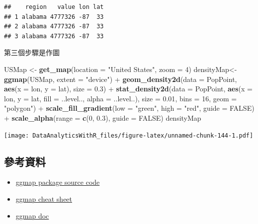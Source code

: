 \documentclass[]{book}
\newenvironment{Shaded}{\begin{snugshade}}{\end{snugshade}}
\newcommand{\KeywordTok}[1]{\textcolor[rgb]{0.13,0.29,0.53}{\textbf{{#1}}}}
\newcommand{\DataTypeTok}[1]{\textcolor[rgb]{0.13,0.29,0.53}{{#1}}}
\newcommand{\DecValTok}[1]{\textcolor[rgb]{0.00,0.00,0.81}{{#1}}}
\newcommand{\FloatTok}[1]{\textcolor[rgb]{0.00,0.00,0.81}{{#1}}}
\newcommand{\StringTok}[1]{\textcolor[rgb]{0.31,0.60,0.02}{{#1}}}
\newcommand{\OtherTok}[1]{\textcolor[rgb]{0.56,0.35,0.01}{{#1}}}
\newcommand{\NormalTok}[1]{{#1}}
\providecommand{\tightlist}{%
  \setlength{\itemsep}{0pt}\setlength{\parskip}{0pt}}
\theoremstyle{definition}
\theoremstyle{definition}
\theoremstyle{remark}
\begin{document}
\begin{verbatim}
##    region   value lon lat
## 1 alabama 4777326 -87  33
## 2 alabama 4777326 -87  33
## 3 alabama 4777326 -87  33
\end{verbatim}

第三個步驟是作圖

\begin{Shaded}
\begin{Highlighting}[]
\NormalTok{USMap <-}\StringTok{ }\KeywordTok{get_map}\NormalTok{(}\DataTypeTok{location =} \StringTok{"United States"}\NormalTok{, }\DataTypeTok{zoom =} \DecValTok{4}\NormalTok{)}
\NormalTok{densityMap<-}\KeywordTok{ggmap}\NormalTok{(USMap, }\DataTypeTok{extent =} \StringTok{"device"}\NormalTok{) +}\StringTok{ }
\StringTok{    }\KeywordTok{geom_density2d}\NormalTok{(}\DataTypeTok{data =} \NormalTok{PopPoint, }\KeywordTok{aes}\NormalTok{(}\DataTypeTok{x =} \NormalTok{lon, }\DataTypeTok{y =} \NormalTok{lat), }\DataTypeTok{size =} \FloatTok{0.3}\NormalTok{) +}\StringTok{ }
\StringTok{    }\KeywordTok{stat_density2d}\NormalTok{(}\DataTypeTok{data =} \NormalTok{PopPoint, }
            \KeywordTok{aes}\NormalTok{(}\DataTypeTok{x =} \NormalTok{lon, }\DataTypeTok{y =} \NormalTok{lat, }\DataTypeTok{fill =} \NormalTok{..level.., }\DataTypeTok{alpha =} \NormalTok{..level..), }
                \DataTypeTok{size =} \FloatTok{0.01}\NormalTok{, }\DataTypeTok{bins =} \DecValTok{16}\NormalTok{, }\DataTypeTok{geom =} \StringTok{"polygon"}\NormalTok{) +}\StringTok{ }
\StringTok{    }\KeywordTok{scale_fill_gradient}\NormalTok{(}\DataTypeTok{low =} \StringTok{"green"}\NormalTok{, }\DataTypeTok{high =} \StringTok{"red"}\NormalTok{, }\DataTypeTok{guide =} \OtherTok{FALSE}\NormalTok{) +}\StringTok{ }
\StringTok{    }\KeywordTok{scale_alpha}\NormalTok{(}\DataTypeTok{range =} \KeywordTok{c}\NormalTok{(}\DecValTok{0}\NormalTok{, }\FloatTok{0.3}\NormalTok{), }\DataTypeTok{guide =} \OtherTok{FALSE}\NormalTok{)}
\NormalTok{densityMap}
\end{Highlighting}
\end{Shaded}

\texttt{[image: DataAnalyticsWithR\_files/figure-latex/unnamed-chunk-144-1.pdf]}

\subsection{參考資料}

\begin{itemize}
\tightlist
\item
  \href{https://github.com/dkahle/ggmap}{ggmap package source code}
\item
  \href{https://www.nceas.ucsb.edu/~frazier/RSpatialGuides/ggmap/ggmapCheatsheet.pdf}{ggmap
  cheat sheet}
\item
  \href{https://dl.dropboxusercontent.com/u/24648660/ggmap\%20useR\%202012.pdf}{ggmap
  doc}
\end{itemize}
\end{document}

